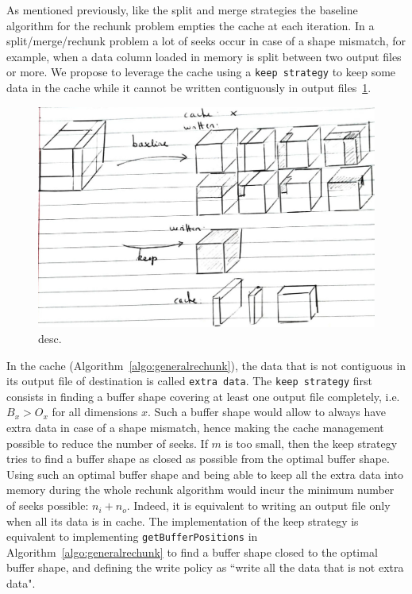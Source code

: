 \documentclass[conference]{IEEEtran}
\begin{document}
As mentioned previously, like the split and merge strategies the baseline
algorithm for the rechunk problem empties the cache at each iteration. In a
split/merge/rechunk problem a lot of seeks occur in case of a shape mismatch,
for example, when a data column loaded in memory is split between two output
files or more. We propose to leverage the cache using a \texttt{keep strategy}
to keep some data in the cache while it cannot be written contiguously in output
files~\ref{fig:keepvsbaseline}.

\begin{figure}[h]
\centering
\includegraphics[scale=0.25]{./figures/new/naive_vs_keep.jpeg}
\caption{desc.}
\label{fig:keepvsbaseline}
\end{figure}

In the cache (Algorithm~\ref{algo:generalrechunk}), the data that is not
contiguous in its output file of destination is called \texttt{extra data}.
The \texttt{keep strategy} first consists in finding a buffer shape covering at least
one output file completely, i.e. $B_x>O_x$ for all dimensions $x$.
Such a buffer shape would allow to always have extra data in case of a shape
mismatch, hence making the cache management possible to reduce the number of seeks.
If $m$ is too small, then the keep strategy tries to find a buffer
shape as closed as possible from the optimal buffer shape. Using such an optimal
buffer shape and being able to keep all the extra data into memory during the
whole rechunk algorithm would incur the minimum number of seeks possible: $n_i + n_o$.
Indeed, it is equivalent to writing an output file only when all its data is in
cache.
The implementation of the keep strategy is equivalent to implementing
\texttt{getBufferPositions} in Algorithm~\ref{algo:generalrechunk} to find a
buffer shape closed to the optimal buffer shape, and defining the write policy
as ``write all the data that is not extra data".
\end{document}
